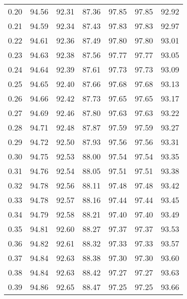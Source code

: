 \begin{tabular}{|c|c|c|c|c|c|c|}
      0.20 &     94.56 &     92.31 &      87.36 &   97.85 &      97.85 &         92.92 \\
      0.21 &     94.59 &     92.34 &      87.43 &   97.83 &      97.83 &         92.97 \\
      0.22 &     94.61 &     92.36 &      87.49 &   97.80 &      97.80 &         93.01 \\
      0.23 &     94.63 &     92.38 &      87.56 &   97.77 &      97.77 &         93.05 \\
      0.24 &     94.64 &     92.39 &      87.61 &   97.73 &      97.73 &         93.09 \\
      0.25 &     94.65 &     92.40 &      87.66 &   97.68 &      97.68 &         93.13 \\
      0.26 &     94.66 &     92.42 &      87.73 &   97.65 &      97.65 &         93.17 \\
      0.27 &     94.69 &     92.46 &      87.80 &   97.63 &      97.63 &         93.22 \\
      0.28 &     94.71 &     92.48 &      87.87 &   97.59 &      97.59 &         93.27 \\
      0.29 &     94.72 &     92.50 &      87.93 &   97.56 &      97.56 &         93.31 \\
      0.30 &     94.75 &     92.53 &      88.00 &   97.54 &      97.54 &         93.35 \\
      0.31 &     94.76 &     92.54 &      88.05 &   97.51 &      97.51 &         93.38 \\
      0.32 &     94.78 &     92.56 &      88.11 &   97.48 &      97.48 &         93.42 \\
      0.33 &     94.78 &     92.57 &      88.16 &   97.44 &      97.44 &         93.45 \\
      0.34 &     94.79 &     92.58 &      88.21 &   97.40 &      97.40 &         93.49 \\
      0.35 &     94.81 &     92.60 &      88.27 &   97.37 &      97.37 &         93.53 \\
      0.36 &     94.82 &     92.61 &      88.32 &   97.33 &      97.33 &         93.57 \\
      0.37 &     94.84 &     92.63 &      88.38 &   97.30 &      97.30 &         93.60 \\
      0.38 &     94.84 &     92.63 &      88.42 &   97.27 &      97.27 &         93.63 \\
      0.39 &     94.86 &     92.65 &      88.47 &   97.25 &      97.25 &         93.66 \\

\end{tabular}
